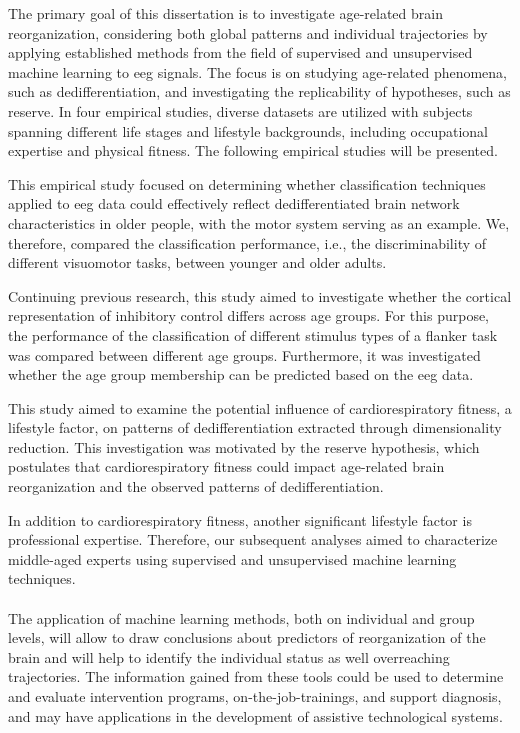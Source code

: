 The primary goal of this dissertation is to investigate age-related brain reorganization, considering both global patterns and individual trajectories by applying established methods from the field of supervised and unsupervised machine learning to \gls{eeg} signals. The focus is on studying age-related phenomena, such as dedifferentiation, and investigating the replicability of hypotheses, such as reserve. In four empirical studies, diverse datasets are utilized with subjects spanning different life stages and lifestyle backgrounds, including occupational expertise and physical fitness. The following empirical studies will be presented.

\begin{quote}
\end{quote}
This empirical study focused on determining whether classification techniques applied to \gls{eeg} data could effectively reflect dedifferentiated brain network characteristics in older people, with the motor system serving as an example. We, therefore, compared the classification performance, i.e., the discriminability of different visuomotor tasks, between younger and older adults.

\begin{quote}
\end{quote}
Continuing previous research, this study aimed to investigate whether the cortical representation of inhibitory control differs across age groups. For this purpose, the performance of the classification of different stimulus types of a flanker task was compared between different age groups. Furthermore, it was investigated whether the age group membership can be predicted based on the \gls{eeg} data.

\begin{quote}
\end{quote}
This study aimed to examine the potential influence of cardiorespiratory fitness, a lifestyle factor, on patterns of dedifferentiation extracted through dimensionality reduction. This investigation was motivated by the reserve hypothesis, which postulates that cardiorespiratory fitness could impact age-related brain reorganization and the observed patterns of dedifferentiation.

\begin{quote}
\end{quote}
In addition to cardiorespiratory fitness, another significant lifestyle factor is professional expertise. Therefore, our subsequent analyses aimed to characterize middle-aged experts using supervised and unsupervised machine learning techniques.\\
\\
The application of machine learning methods, both on individual and group levels, will allow to draw conclusions about predictors of reorganization of the brain and will help to identify the individual status as well overreaching trajectories. The information gained from these tools could be used to determine and evaluate intervention programs, on-the-job-trainings, and support diagnosis, and may have applications in the development of assistive technological systems. 